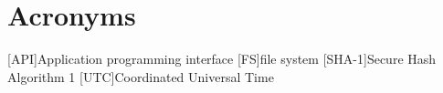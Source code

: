 \chapter*{Acronyms}
\begin{acronym}
    [API]{Application programming interface}
    [FS]{file system}
    [SHA-1]{Secure Hash Algorithm 1}
    [UTC]{Coordinated Universal Time}
\end{acronym}
